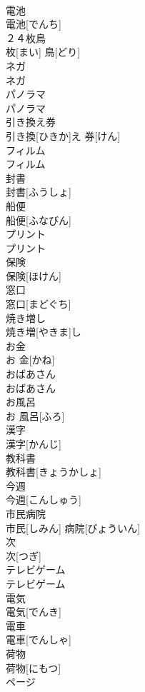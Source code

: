 \documentclass[8pt]{extreport}
\begin{document}
\begin{CJK}{UTF8}{min}
\\	電池	
\\	電池[でんち]
\\	２４枚鳥	
\\	枚[まい] 鳥[どり]
\\	ネガ	
\\	ネガ
\\	パノラマ	
\\	パノラマ
\\	引き換え券	
\\	引き換[ひきか]え 券[けん]
\\	フィルム	
\\	フィルム
\\	封書	
\\	封書[ふうしょ]
\\	船便	
\\	船便[ふなびん]
\\	プリント	
\\	プリント
\\	保険	
\\	保険[ほけん]
\\	窓口	
\\	窓口[まどぐち]
\\	焼き増し	
\\	焼き増[やきま]し
\\	お金	
\\	お 金[かね]
\\	おばあさん	
\\	おばあさん
\\	お風呂	
\\	お 風呂[ふろ]
\\	漢字	
\\	漢字[かんじ]
\\	教科書	
\\	教科書[きょうかしょ]
\\	今週	
\\	今週[こんしゅう]
\\	市民病院	
\\	市民[しみん] 病院[びょういん]
\\	次	
\\	次[つぎ]
\\	テレビゲーム	
\\	テレビゲーム
\\	電気	
\\	電気[でんき]
\\	電車	
\\	電車[でんしゃ]
\\	荷物	
\\	荷物[にもつ]
\\	ページ	

\end{CJK}
\end{document}
